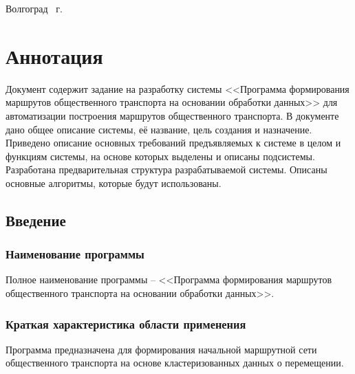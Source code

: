\vspace{\fill}
\begin{center}
    Волгоград \the\year\ г.
\end{center}
\newpage

\tocless\part{Аннотация}
Документ содержит задание на разработку системы <<Программа формирования маршрутов общественного транспорта 
на основании обработки данных>> для автоматизации построения маршрутов общественного транспорта. В документе 
дано общее описание системы, её название, цель создания и назначение. Приведено описание основных требований 
предъявляемых к системе в целом и функциям системы, на основе которых выделены и описаны подсистемы. 
Разработана предварительная структура разрабатываемой системы. Описаны основные алгоритмы, которые будут 
использованы.
\newpage

\startcontents[sections]
\begin{changemargin}{-0.5cm}{0pt}
\end{changemargin}

% 
%

\chapter{Введение}
\section{Наименование программы}
Полное наименование программы -- <<Программа формирования маршрутов 
общественного транспорта на основании обработки данных>>.

\section{Краткая характеристика области применения}
Программа предназначена для формирования начальной маршрутной сети общественного транспорта на основе 
кластеризованных данных о перемещении.

